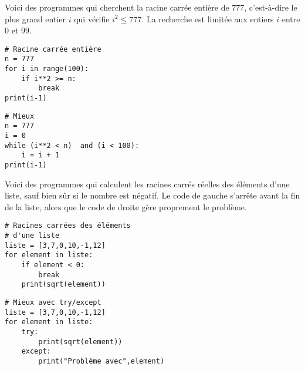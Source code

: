 \documentclass[11pt,class=report,crop=false]{standalone}
\begin{document}
\begin{cours}
\begin{exemple}
Voici des programmes qui cherchent la racine carrée entière de $777$, c'est-à-dire le plus grand entier $i$ qui vérifie $i^2 \le 777$. La recherche est limitée aux entiers $i$ entre $0$ et $99$.

\begin{minipage}{0.4\textwidth}
\begin{lstlisting}
# Racine carrée entière
n = 777
for i in range(100):
    if i**2 >= n:
        break
print(i-1)
\end{lstlisting}
\end{minipage}\qquad\qquad
\begin{minipage}{0.4\textwidth}
\begin{lstlisting}
# Mieux
n = 777
i = 0 
while (i**2 < n)  and (i < 100):
    i = i + 1
print(i-1) 
\end{lstlisting}
\end{minipage}
\end{exemple}

\begin{exemple}

Voici des programmes qui calculent les racines carrés réelles des éléments d'une liste, sauf bien sûr si le nombre est négatif. Le code de gauche s'arrête avant la fin de la liste, alors que le code de droite gère proprement le problème.

\begin{minipage}{0.4\textwidth}
\begin{lstlisting}
# Racines carrées des éléments 
# d'une liste
liste = [3,7,0,10,-1,12]
for element in liste:
    if element < 0:
        break
    print(sqrt(element))
\end{lstlisting}
\end{minipage}\qquad\qquad
\begin{minipage}{0.4\textwidth}
\begin{lstlisting}
# Mieux avec try/except
liste = [3,7,0,10,-1,12]
for element in liste:
    try: 
        print(sqrt(element))
    except:
        print("Problème avec",element)
\end{lstlisting}
\end{minipage}
\end{exemple}


\end{cours}
\end{document}
